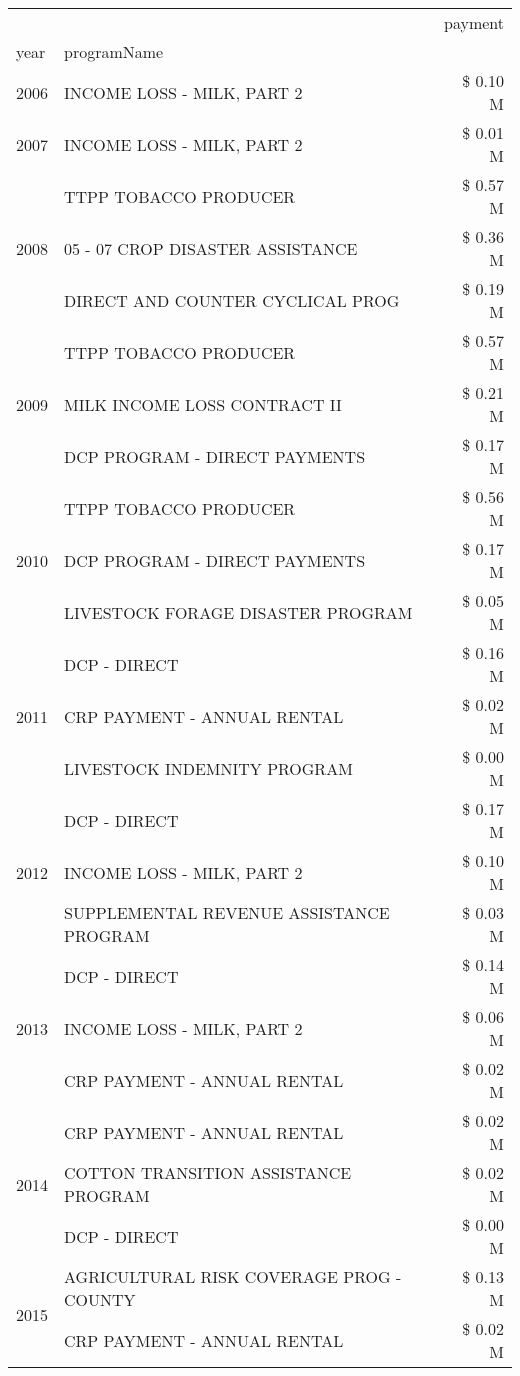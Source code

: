\begin{tabular}{llr}
\toprule
 &  & payment \\
year & programName &  \\
\midrule
2006 & INCOME LOSS - MILK, PART 2 & \$ 0.10 M \\
\cline{1-3}
2007 & INCOME LOSS - MILK, PART 2 & \$ 0.01 M \\
\cline{1-3}
\multirow[t]{3}{*}{2008} & TTPP TOBACCO PRODUCER & \$ 0.57 M \\
 & 05 - 07 CROP DISASTER ASSISTANCE & \$ 0.36 M \\
 & DIRECT AND COUNTER CYCLICAL PROG & \$ 0.19 M \\
\cline{1-3}
\multirow[t]{3}{*}{2009} & TTPP TOBACCO PRODUCER & \$ 0.57 M \\
 & MILK INCOME LOSS CONTRACT II & \$ 0.21 M \\
 & DCP PROGRAM - DIRECT PAYMENTS & \$ 0.17 M \\
\cline{1-3}
\multirow[t]{3}{*}{2010} & TTPP TOBACCO PRODUCER & \$ 0.56 M \\
 & DCP PROGRAM - DIRECT PAYMENTS & \$ 0.17 M \\
 & LIVESTOCK FORAGE DISASTER  PROGRAM & \$ 0.05 M \\
\cline{1-3}
\multirow[t]{3}{*}{2011} & DCP - DIRECT & \$ 0.16 M \\
 & CRP PAYMENT - ANNUAL RENTAL & \$ 0.02 M \\
 & LIVESTOCK INDEMNITY PROGRAM & \$ 0.00 M \\
\cline{1-3}
\multirow[t]{3}{*}{2012} & DCP - DIRECT & \$ 0.17 M \\
 & INCOME LOSS - MILK, PART 2 & \$ 0.10 M \\
 & SUPPLEMENTAL REVENUE ASSISTANCE PROGRAM & \$ 0.03 M \\
\cline{1-3}
\multirow[t]{3}{*}{2013} & DCP - DIRECT & \$ 0.14 M \\
 & INCOME LOSS - MILK, PART 2 & \$ 0.06 M \\
 & CRP PAYMENT - ANNUAL RENTAL & \$ 0.02 M \\
\cline{1-3}
\multirow[t]{3}{*}{2014} & CRP PAYMENT - ANNUAL RENTAL & \$ 0.02 M \\
 & COTTON TRANSITION ASSISTANCE PROGRAM & \$ 0.02 M \\
 & DCP - DIRECT & \$ 0.00 M \\
\cline{1-3}
\multirow[t]{3}{*}{2015} & AGRICULTURAL RISK COVERAGE PROG - COUNTY & \$ 0.13 M \\
 & CRP PAYMENT - ANNUAL RENTAL & \$ 0.02 M \\

\end{tabular}
